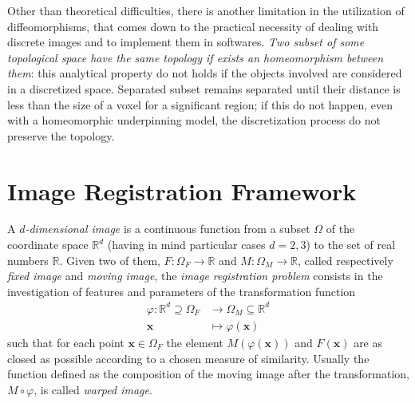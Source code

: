 
Other than theoretical difficulties, there is another limitation in the utilization of diffeomorphisms, that comes down to the practical necessity of dealing with discrete images and to implement them in softwares. \emph{Two subset of some topological space have the same topology if exists an homeomorphism between them}: this analytical property do not holds if the objects involved are considered in a discretized space. Separated subset remains separated until their distance is less than the size of a voxel for a significant region; if this do not happen, even with a homeomorphic underpinning model, the discretization process do not preserve the topology.



\section{Image Registration Framework}\label{se:registration_framework}

A \emph{$d$-dimensional image} is a continuous function from a subset $\Omega$ of the coordinate space $\mathbb{R}^{d}$ (having in mind particular cases $d=2,3$) to the set of real numbers $\mathbb{R}$. Given two of them, $F : \Omega_{F}  \rightarrow\mathbb{R} $ and $M : \Omega_{M}  \rightarrow\mathbb{R} $, called respectively \emph{fixed image} and \emph{moving image}, the \emph{image registration problem} consists in the investigation of features and parameters of the transformation function
\begin{align*}
\varphi :\mathbb{R}^{d} \supseteq \Omega_{F} & \longrightarrow \Omega_{M}\subseteq \mathbb{R}^{d}   \\
\mathbf{x} &\longmapsto \varphi (\mathbf{x}) 
\end{align*}
such that for each point $\mathbf{x}\in \Omega_{F} $ the element $M(\varphi (\mathbf{x}))$ and $F(\mathbf{x})$ are as closed as possible according to a chosen measure of similarity. Usually the function defined as the composition of the moving image after the transformation, $M\circ\varphi $, is called \emph{warped image}.\\

